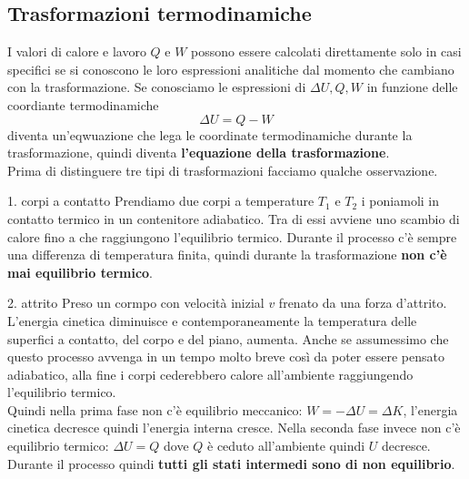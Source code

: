 \documentclass[x11names]{report}
\begin{document}
	\subsection{Trasformazioni termodinamiche}
	I valori di calore e lavoro \(Q\) e \(W\) possono essere calcolati direttamente solo in casi specifici se si conoscono le loro espressioni analitiche dal momento che cambiano con la trasformazione.  Se conosciamo le espressioni di \(\Delta U,Q,W\) in funzione delle coordiante termodinamiche 
	\[ 
	\Delta U = Q -W
	\]
	diventa un'eqwuazione che lega le coordinate termodinamiche durante la trasformazione, quindi diventa \textbf{l'equazione della trasformazione}.\\
	
	\noindent
	Prima di distinguere tre tipi di trasformazioni facciamo qualche osservazione.
	\begin{es}{1. corpi a contatto}
		Prendiamo due corpi a temperature \(T_1\) e \(T_2\) i poniamoli in contatto termico in un contenitore adiabatico. Tra di essi avviene uno scambio di calore fino a che raggiungono l'equilibrio termico. Durante il processo c'è sempre una differenza di temperatura finita, quindi durante la trasformazione \textbf{non c'è mai equilibrio termico}.
	\end{es}
	\begin{es}{2. attrito}
		Preso un cormpo con velocità inizial \(v\) frenato da una forza d'attrito. L'energia cinetica diminuisce e contemporaneamente la temperatura delle superfici a contatto, del corpo e del piano, aumenta. Anche se assumessimo che questo processo avvenga in un tempo molto breve così da poter essere pensato adiabatico, alla fine i corpi cederebbero calore all'ambiente raggiungendo l'equilibrio termico. \\
		
		Quindi nella prima fase non c'è equilibrio meccanico: \(W = -\Delta U = \Delta K\), l'energia cinetica decresce quindi l'energia interna cresce. Nella seconda fase invece non c'è equilibrio termico: \(\Delta U = Q\) dove \(Q\) è ceduto all'ambiente quindi \(U\) decresce. Durante il processo quindi \textbf{tutti gli stati intermedi sono di non equilibrio}.
	\end{es}
	
\end{document}
